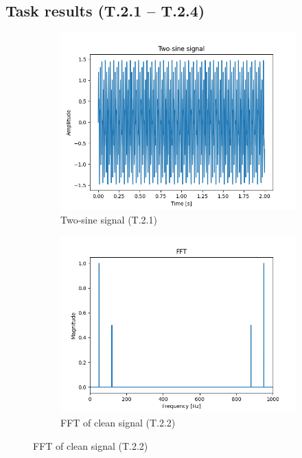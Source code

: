 \documentclass{article}
\begin{document}
\subsection*{Task results (T.2.1 – T.2.4)}
\begin{figure}[H]
\centering
\begin{subfigure}{0.45\linewidth}
  \includegraphics[width=\linewidth]{results/figures/task2_1_sum_two_sine_waves.png}
  \caption{Two‑sine signal (T.2.1)}
\end{subfigure}\hfill
\begin{subfigure}{0.45\linewidth}
  \includegraphics[width=\linewidth]{results/figures/task2_2_normalized_spectrum.png}
  \caption{FFT of clean signal (T.2.2)}
\end{subfigure}


\end{figure}
\end{document}
